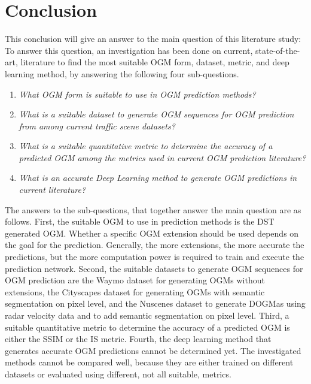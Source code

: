 \section{Conclusion} \label{sec:conclusion}
This conclusion will give an answer to the main question of this literature study:  
To answer this question, an investigation has been done on current, state-of-the-art, literature to find the most suitable \gls{OGM} form, dataset, metric, and deep learning method, by answering the following four sub-questions. 

\begin{enumerate}
	\item \textit{What \gls{OGM} form is suitable to use in \gls{OGM} prediction methods?}
	\item \textit{What is a suitable dataset to generate \gls{OGM} sequences for \gls{OGM} prediction from among current traffic scene datasets?}
	\item \textit{What is a suitable quantitative metric to determine the accuracy of a predicted \gls{OGM} among the metrics used in current \gls{OGM} prediction literature?}
	\item \textit{What is an accurate Deep Learning method to generate \gls{OGM} predictions in current literature?}	
\end{enumerate}

The answers to the sub-questions, that together answer the main question are as follows. First, the suitable \gls{OGM} to use in prediction methods is the \gls{DST} generated \gls{OGM}. Whether a specific \gls{OGM} extension should be used depends on the goal for the prediction. Generally, the more extensions, the more accurate the predictions, but the more computation power is required to train and execute the prediction network. Second, the suitable datasets to generate \gls{OGM} sequences for \gls{OGM} prediction are the Waymo \cite{sun2020scalability} dataset for generating \glspl{OGM} without extensions, the Cityscapes \cite{cordts2016cityscapes} dataset for generating \glspl{OGM} with semantic segmentation on pixel level, and the Nuscenes \cite{caesar2020nuscenes} dataset to generate \glspl{DOGMa} using radar velocity data and to add semantic segmentation on pixel level. Third, a suitable quantitative metric to determine the accuracy of a predicted \gls{OGM} is either the \gls{SSIM} or the \gls{IS} metric. Fourth, the deep learning method that generates accurate \gls{OGM} predictions cannot be determined yet. The investigated methods cannot be compared well, because they are either trained on different datasets or evaluated using different, not all suitable, metrics. 


